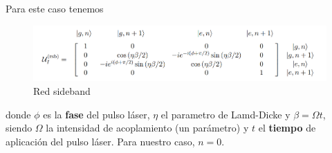 
Para este caso tenemos 
\begin{figure}[H]
    \centering 
    \includegraphics[width=1\linewidth]{Figuras/Fig_ions_U_rsb.png}
    \caption{Red sideband}
    \label{Fig_ions_U_rsb}
\end{figure}
donde $\phi$ es la \textbf{fase} del pulso láser, $\eta$ el parametro de Lamd-Dicke y $\beta = \Omega t$, siendo $\Omega$ la intensidad de acoplamiento (un parámetro) y $t$ el \textbf{tiempo} de aplicación del pulso láser. Para nuestro caso, $n = 0$. 



